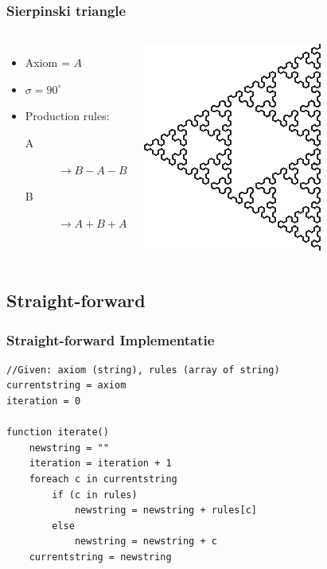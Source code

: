 \documentclass[ignorenonframetext,compress]{beamer}
\begin{document}
\begin{frame}[fragile]
	\frametitle{Sierpinski triangle}
\begin{columns}[l]
\begin{itemize}
\item Axiom = $A$
\item $\sigma = 90^{\circ}$
\item Production rules:
	\begin{description}
	\item[A] $\rightarrow B-A-B$
	\item[B] $\rightarrow A+B+A$
	\end{description}
\end{itemize}
\includegraphics[width=\textwidth]{triangle.png}
\end{columns}
\end{frame}

\subsection{Straight-forward}

\begin{frame}[fragile]
	\frametitle{Straight-forward Implementatie}
\begin{verbatim}
//Given: axiom (string), rules (array of string)
currentstring = axiom
iteration = 0

function iterate()
    newstring = ""
    iteration = iteration + 1
    foreach c in currentstring
        if (c in rules)
            newstring = newstring + rules[c]
        else
            newstring = newstring + c
    currentstring = newstring
\end{verbatim}
\end{frame}
\end{document}
